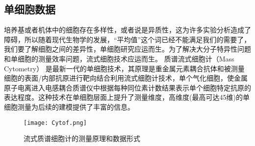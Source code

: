 \subsection{单细胞数据}
培养基或者机体中的细胞存在多样性，或者说是异质性，这为许多实验分析造成了障碍，所以随着现代生物学的发展，“平均值”这个词已经不能满足我们的需要了，我们要了解细胞之间的差异性，单细胞研究应运而生。为了解决大分子特异性问题和单细胞的测量效率问题，流式细胞技术应运而生\cite{Bendall:2012gz}。
质谱流式细胞计（Mass Cytometry） 是最新一代的单细胞技术，其原理是重金属元素耦合抗体和被测量细胞的表面/内部抗原进行靶向结合利用流式细胞计技术，单个气化细胞，使金属原子电离进入电感耦合质谱仪中根据每种同位素计数结果表示单个细胞特定抗原的表达程度。这种技术在单细胞层面上提升了测量维度，高维度(最高可达45维)的单细胞测量为后续的建模提供了丰富的信息\cite{2011Sci...332..687B}。

\begin{figure}[htbp]
	\centering
	\texttt{[image: Cytof.png]}
	\caption{流式质谱细胞计的测量原理和数据形式}\label{fig:Cytof}
\end{figure}






